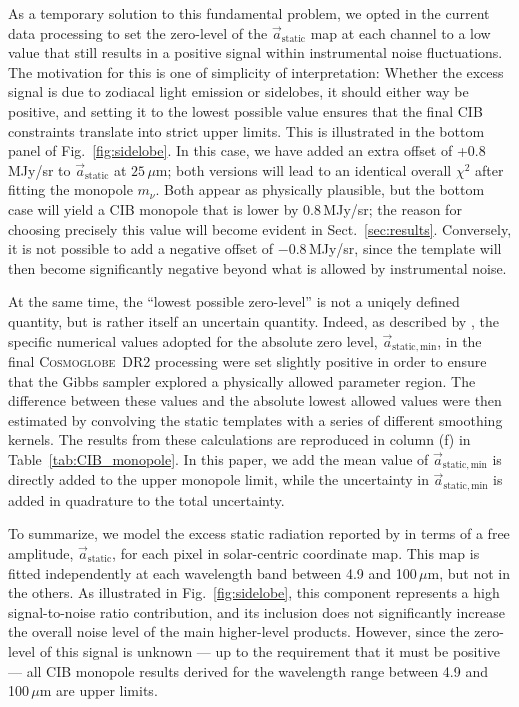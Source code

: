 \documentclass{aa}
\renewcommand{\a}[0]{\vec{a}}
\newcommand{\cosmoglobe}{\textsc{Cosmoglobe}}
\begin{document}
As a temporary solution to this fundamental problem, we opted in the
current data processing to set the zero-level of the
$\a_{\mathrm{static}}$ map at each channel to a low value that still
results in a positive signal within instrumental noise
fluctuations. The motivation for this is one of simplicity of
interpretation: Whether the excess signal is due to zodiacal light
emission or sidelobes, it should either way be positive, and setting
it to the lowest possible value ensures that the final CIB constraints
translate into strict upper limits. This is illustrated in the bottom
panel of Fig.~\ref{fig:sidelobe}. In this case, we have added an extra
offset of +0.8\,MJy/sr to $\a_{\mathrm{static}}$ at
$25\,\mu\mathrm{m}$; both versions will lead to an identical overall
$\chi^2$ after fitting the monopole $m_{\nu}$.  Both appear as
physically plausible, but the bottom case will yield a CIB monopole
that is lower by 0.8\,MJy/sr; the reason for choosing precisely this
value will become evident in Sect.~\ref{sec:results}. Conversely, it
is not possible to add a negative offset of $-0.8$\,MJy/sr, since the
template will then become significantly negative beyond what is
allowed by instrumental noise.

At the same time, the ``lowest possible zero-level'' is not a uniqely
defined quantity, but is rather itself an uncertain quantity. Indeed,
as described by \citet{CG02_01}, the specific numerical values adopted
for the absolute zero level, $\a_{\mathrm{static,min}}$, in the final
\cosmoglobe\ DR2 processing were set slightly positive in order to
ensure that the Gibbs sampler explored a physically allowed parameter
region. The difference between these values and the absolute lowest
allowed values were then estimated by convolving the static templates
with a series of different smoothing kernels. The results from these
calculations are reproduced in column (f) in
Table~\ref{tab:CIB_monopole}. In this paper, we add the mean value of
$\a_{\mathrm{static,min}}$ is directly added to the upper monopole
limit, while the uncertainty in $\a_{\mathrm{static,min}}$ is added in
quadrature to the total uncertainty.

To summarize, we model the excess static radiation reported by in
terms of a free amplitude, $\a_{\mathrm{static}}$, for each pixel in
solar-centric coordinate map. This map is fitted independently at each
wavelength band between 4.9 and 100$\,\mu\mathrm{m}$, but not in the
others. As illustrated in Fig.~\ref{fig:sidelobe}, this component
represents a high signal-to-noise ratio contribution, and its
inclusion does not significantly increase the overall noise level of
the main higher-level products. However, since the zero-level of this
signal is unknown --- up to the requirement that it must be positive
--- all CIB monopole results derived for the wavelength range between
4.9 and 100$\,\mu\mathrm{m}$ are upper limits. 
\end{document}
